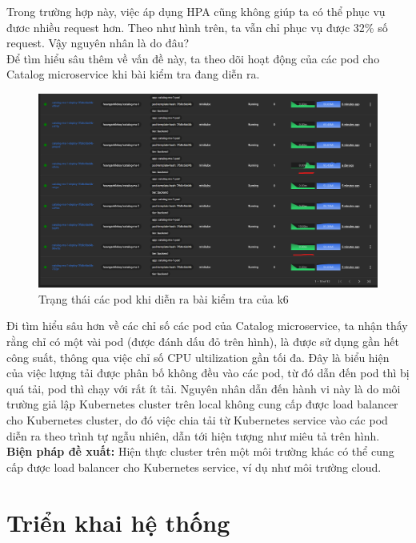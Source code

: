 Trong trường hợp này, việc áp dụng HPA cũng không giúp ta có thể phục vụ đươc nhiều request hơn. Theo như hình trên, ta vẫn chỉ phục vụ được 32\% số request. Vậy nguyên nhân là do đâu?\\[0.5cm]
Để tìm hiểu sâu thêm về vấn đề này, ta theo dõi hoạt động của các pod cho Catalog microservice khi bài kiểm tra đang diễn ra.
\begin{figure}[H]
  \begin{center}
    \includegraphics[scale=0.44]{images/hanh/test-with-hpa-pod-resource-ultilization.png}
    \caption{Trạng thái các pod khi diễn ra bài kiểm tra của k6}
  \end{center}
  \label{}
\end{figure}
Đi tìm hiểu sâu hơn về các chỉ số các pod của Catalog microservice, ta nhận thấy rằng chỉ có một vài pod (được đánh dấu đỏ trên hình), là được sử dụng gần hết công suất, thông qua việc chỉ số CPU ultilization gần tối đa. Đây là biểu hiện của việc lượng tải được phân bố không đều vào các pod, từ đó dẫn đến pod thì bị quá tải, pod thì chạy với rất ít tải. Nguyên nhân dẫn đến hành vi này là do môi trường giả lập Kubernetes cluster trên local không cung cấp được load balancer cho Kubernetes cluster, do đó việc chia tải từ Kubernetes service vào các pod diễn ra theo trình tự ngẫu nhiên, dẫn tới hiện tượng như miêu tả trên hình.\\[0.5cm]
\textbf{Biện pháp đề xuất:} Hiện thực cluster trên một môi trường khác có thể cung cấp được load balancer cho Kubernetes service, ví dụ như môi trường cloud.

\section{Triển khai hệ thống}

